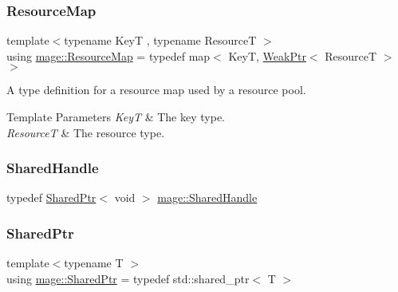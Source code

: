 \subsubsection{\texorpdfstring{Resource\+Map}{ResourceMap}}
{\footnotesize\ttfamily template$<$typename KeyT , typename ResourceT $>$ \\
using \hyperlink{namespacemage_a0b0a087ad59dd4aa0b4b538d8caec216}{mage\+::\+Resource\+Map} = typedef map$<$ KeyT, \hyperlink{namespacemage_aa159a63c0d58464bdf32dfe419dd5dc1}{Weak\+Ptr}$<$ ResourceT $>$ $>$}

A type definition for a resource map used by a resource pool.


\begin{DoxyTemplParams}{Template Parameters}
{\em KeyT} & The key type. \\
\hline
{\em ResourceT} & The resource type. \\
\hline
\end{DoxyTemplParams}
\hypertarget{namespacemage_ab892828913d6129acf71e0cec60467e5}{}\label{namespacemage_ab892828913d6129acf71e0cec60467e5} 
\subsubsection{\texorpdfstring{Shared\+Handle}{SharedHandle}}
{\footnotesize\ttfamily typedef \hyperlink{namespacemage_a1e01ae66713838a7a67d30e44c67703e}{Shared\+Ptr}$<$ void $>$ \hyperlink{namespacemage_ab892828913d6129acf71e0cec60467e5}{mage\+::\+Shared\+Handle}}

\hypertarget{namespacemage_a1e01ae66713838a7a67d30e44c67703e}{}\label{namespacemage_a1e01ae66713838a7a67d30e44c67703e} 
\subsubsection{\texorpdfstring{Shared\+Ptr}{SharedPtr}}
{\footnotesize\ttfamily template$<$typename T $>$ \\
using \hyperlink{namespacemage_a1e01ae66713838a7a67d30e44c67703e}{mage\+::\+Shared\+Ptr} = typedef std\+::shared\+\_\+ptr$<$ T $>$}

\hypertarget{namespacemage_a46c8f54b869a5dc07f520c600b9046bd}{}\label{namespacemage_a46c8f54b869a5dc07f520c600b9046bd} 
